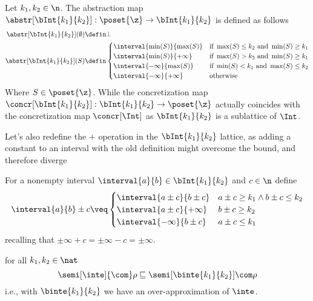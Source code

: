 \begin{definition}\label{def:boundedac}
  Let \(k_1, k_2\in\n\). The abstraction map
  \({\abstr[\bInt{k_1}{k_2}] : \poset{\z} \to \bInt{k_1}{k_2}}\) is
  defined as follows
  \begin{align*}
    \abstr[\bInt{k_1}{k_2}](\emptyset) & \defin \bot \\
    \abstr[\bInt{k_1}{k_2}](S) & \defin \begin{cases}
      \interval{\min(S)}{\max(S)} & \text{if } \max(S) \leq k_2 \text{ and } \min(S) \geq k_1\\
      \interval{\min(S)}{+\infty} & \text{if } \max(S) > k_2 \text{ and } \min(S) \geq k_1 \\
      \interval{-\infty}{\max(S)} & \text{if } \min(S) < k_1 \text{ and } \max(S) \leq k_2 \\
      \interval{-\infty}{+\infty} & \text{otherwise}
    \end{cases}
  \end{align*}
  Where \(S\in\poset{\z}\). While the concretization map
  \({\concr[\bInt{k_1}{k_2}] : \bInt{k_1}{k_2} \to \poset{\z}}\)
  actually coincides with the concretization map \(\concr[\Int]\) as
  \(\bInt{k_1}{k_2}\) is a sublattice of \(\Int\).
\end{definition}

Let's also redefine the \(+\) operation in the \(\bInt{k_1}{k_2}\)
lattice, as adding a constant to an interval with the old definition
might overcome the bound, and therefore diverge

\begin{definition}\label{def:sumbound}
  For a nonempty interval \(\interval{a}{b} \in \bInt{k_1}{k_2}\) and
  \(c \in \n\) define
  \begin{equation*}
    \interval{a}{b} \pm c \veq \begin{cases}
      \interval{a\pm c}{b\pm c} & a \pm c \geq k_1 \land b \pm c \leq k_2 \\
      \interval{a\pm c}{+\infty} & b \pm c \geq k_2 \\
      \interval{-\infty}{b \pm c} & a \pm c \leq k_1
    \end{cases}
  \end{equation*}
  recalling that \(\pm \infty + c = \pm\infty - c = \pm\infty\).
\end{definition}

\begin{lemma}\label{le:leq}
  for all \(k_1, k_2\in\nat\) %
  \begin{equation*}
    \semi[\inte]{\com}\rho \sqsubseteq \semi[\binte{k_1}{k_2}]{\com}\rho
  \end{equation*}
  i.e., with \(\binte{k_1}{k_2}\) we have an over-approximation of \(\inte\).
\end{lemma}

